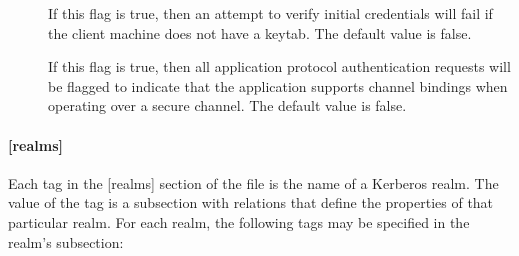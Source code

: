 \documentclass[letterpaper,10pt,english]{sphinxmanual}
\begin{document}
\begin{description}
\item[{}] \leavevmode
If this flag is true, then an attempt to verify initial
credentials will fail if the client machine does not have a
keytab.  The default value is false.

\item[{}] \leavevmode
If this flag is true, then all application protocol authentication
requests will be flagged to indicate that the application supports
channel bindings when operating over a secure channel.  The
default value is false.

\end{description}


\paragraph{{[}realms{]}}
\label{\detokenize{admin/conf_files/krb5_conf:id2}}\label{\detokenize{admin/conf_files/krb5_conf:realms}}
Each tag in the {[}realms{]} section of the file is the name of a Kerberos
realm.  The value of the tag is a subsection with relations that
define the properties of that particular realm.  For each realm, the
following tags may be specified in the realm’s subsection:
\end{document}
